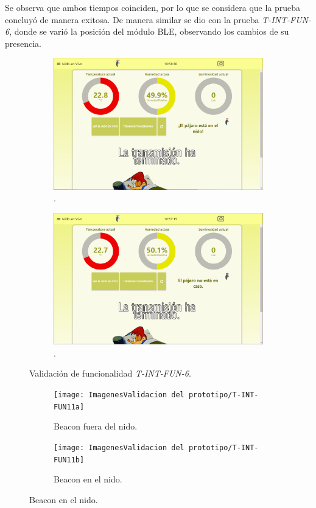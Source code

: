 Se observa que ambos tiempos coinciden, por lo que se considera que la prueba concluyó de manera exitosa. De manera similar se dio con la prueba \textit{T-INT-FUN-6}, donde se varió la posición del módulo BLE, observando los cambios de su presencia.
\begin{figure}[H]
	\centering
		\begin{subfigure}{0.49\textwidth}
			\centering
			\includegraphics[width=\linewidth]{ImagenesValidacion del prototipo/T-INT-FUN-6-1}		
			\caption{.}
		\end{subfigure}\hfill
		\begin{subfigure}{0.49\textwidth}
			\centering
			\includegraphics[width=\linewidth]{ImagenesValidacion del prototipo/T-INT-FUN-6-2}
			\caption{.}
		\end{subfigure}
	\caption{Validación de funcionalidad \textit{T-INT-FUN-6}.}
\end{figure}
\begin{figure}[H]
\centering
	\begin{subfigure}{0.49\textwidth}
		\centering
		\texttt{[image: ImagenesValidacion del prototipo/T-INT-FUN11a]}	
		\caption{Beacon fuera del nido.}
	\end{subfigure}\hfill
	\begin{subfigure}{0.49\textwidth}
		\centering
		\texttt{[image: ImagenesValidacion del prototipo/T-INT-FUN11b]}
		\caption{Beacon en el nido.}
	\end{subfigure}
\end{figure}
